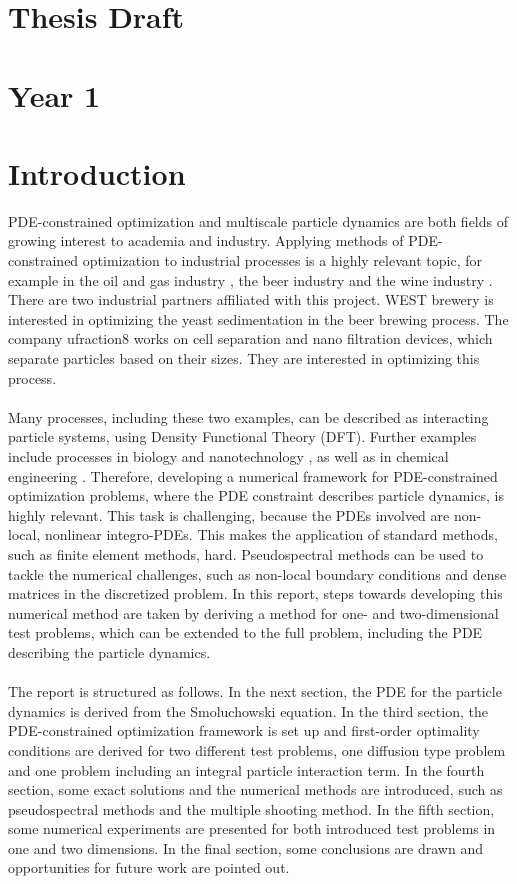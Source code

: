 \documentclass[11pt, a4paper]{article}
\theoremstyle{definition}
\begin{document}
\section*{Thesis Draft}	
	
	
\section*{Year 1}	
\section{Introduction}
PDE-constrained optimization and multiscale particle dynamics are both fields of growing interest to academia and industry. Applying methods of PDE-constrained optimization to industrial processes is a highly relevant topic, for example in the oil and gas industry \cite{Brandman2018}, the beer industry \cite{RamirezW.F.2007Obf} and the wine industry \cite{MergerJuri2017Ocoa}. 
There are two industrial partners affiliated with this project. WEST brewery is interested in optimizing the yeast sedimentation in the beer brewing process. The company ufraction8 works on cell separation and nano filtration devices, which separate particles based on their sizes. They are interested in optimizing this process.
\\
\\
Many processes, including these two examples, can be described as interacting particle systems, using Density Functional Theory (DFT). Further examples include processes in biology and nanotechnology \cite{FrinkDFT}, as well as in chemical engineering \cite{WuJianzhong2006Dftf}.
Therefore, developing a numerical framework for PDE-constrained optimization problems, where the PDE constraint describes particle dynamics, is highly relevant. This task is challenging, because the PDEs involved are non-local, nonlinear integro-PDEs. This makes the application of standard methods, such as finite element methods, hard. Pseudospectral methods can be used to tackle the numerical challenges, such as non-local boundary conditions and dense matrices in the discretized problem.
In this report, steps towards developing this numerical method are taken by deriving a method for one- and two-dimensional test problems, which can be extended to the full problem, including the PDE describing the particle dynamics.
\\
\\
The report is structured as follows. In the next section, the PDE for the particle dynamics is derived from the Smoluchowski equation. In the third section, the PDE-constrained optimization framework is set up and first-order optimality conditions are derived for two different test problems, one diffusion type problem and one problem including an integral particle interaction term.
In the fourth section, some exact solutions and the numerical methods are introduced, such as pseudospectral methods and the multiple shooting method.
In the fifth section, some numerical experiments are presented for both introduced test problems in one and two dimensions.
In the final section, some conclusions are drawn and opportunities for future work are pointed out.
\end{document}
